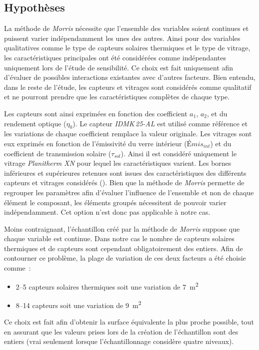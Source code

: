 \subsection{Hypothèses} %
\label{sub:hypotheses_morris}
La méthode de \textit{Morris} nécessite que l’ensemble des variables soient continues et
puissent varier indépendamment les unes des autres. Ainsi pour des variables qualitatives
comme le type de capteurs solaires thermiques et le type de vitrage, les caractéristiques
principales ont été considérées comme indépendantes uniquement lors de l’étude de
sensibilité. Ce choix est fait uniquement afin d’évaluer de possibles interactions existantes avec d’autres facteurs.
Bien entendu, dans le reste de l’étude, les capteurs et vitrages sont considérés comme
qualitatif et ne pourront prendre que les caractéristiques complètes de chaque type.

Les capteurs sont ainsi exprimées en fonction des coefficient $a_{1}$,
$a_{2}$, et du rendement optique ($\eta_{0}$). Le capteur \textit{IDMK\,25-AL} est
utilisé comme référence et les variations de chaque coefficient remplace la valeur originale.
Les vitrages sont eux exprimés en fonction de l’émissivité
du verre intérieur ($Émis_{int}$) et du coefficient de transmission solaire ($\tau_{sol}$).
Ainsi il est considéré uniquement le vitrage \textit{Planitherm XN} pour lequel les
caractéristiques varient. Les bornes inférieures et supérieures retenues sont issues des caractéristiques
des différents capteurs et vitrages considérés ().
Bien que la méthode de \textit{Morris} permette de regrouper les paramètres afin d’évaluer
l’influence de l’ensemble et non de chaque élément le composant, les éléments groupés
nécessitent de pouvoir varier indépendamment. Cet option n’est donc pas applicable à notre cas.


Moins contraignant, l’échantillon créé par la méthode de \textit{Morris} suppose que
chaque variable est continue. Dans notre cas le nombre de capteurs solaires thermiques
et de capteurs  sont cependant obligatoirement des entiers. Afin de contourner
ce problème, la plage de variation de ces deux facteurs a été choisie comme~:
\begin{itemize}
  \item \SIrange{2}{5}{} capteurs solaires thermiques soit une variation de \SI{7}{\metre\squared}
  \item \SIrange{8}{14}{} capteurs  soit une variation de \SI{9}{\metre\squared}
\end{itemize}
Ce choix est fait afin d’obtenir la surface équivalente la plus proche possible, tout
en assurant que les valeurs prises lors de la création de l’échantillon sont des entiers
(vrai seulement lorsque l’échantillonnage considère quatre niveaux).


